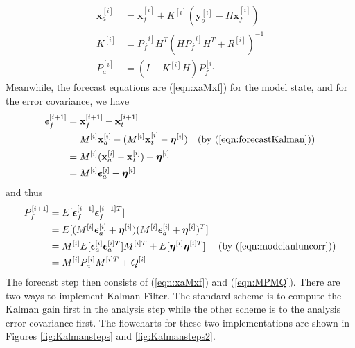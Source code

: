 \begin{subequations}
\begin{align}
\textbf{x}_a^{[i]} &= \textbf{x}_f^{[i]} + K^{[i]}(\textbf{y}_o^{[i]} - H\textbf{x}_f^{[i]}) \\
K^{[i]} &= P_f^{[i]}H^T(HP_f^{[i]}H^T + R^{[i]})^{-1} \\
P_a^{[i]} &= (I - K^{[i]}H)P_f^{[i]} 
\end{align}
\end{subequations}
Meanwhile, the forecast equations are (\ref{eqn:xaMxf}) for the model state, and for the error covariance, we have
\begin{align}
\bm{\epsilon}_f^{[i+1]} &= \textbf{x}_f^{[i+1]} - \textbf{x}_t^{[i+1]} \nonumber \\
&= M^{[i]}\textbf{x}_a^{[i]} - (M^{[i]}\textbf{x}_t^{[i]} - \bm{\eta}^{[i]}) &\text{(by (\ref{eqn:forecastKalman}))} \nonumber \\
&= M^{[i]}(\textbf{x}_a^{[i]} - \textbf{x}_t^{[i]}) + \bm{\eta}^{[i]} \nonumber \\
&= M^{[i]}\bm{\epsilon}_a^{[i]} + \bm{\eta}^{[i]}  
\end{align}
and thus
\begin{align}
P_f^{[i+1]} &= E[\bm{\epsilon}_f^{[i+1]}\bm{\epsilon}_f^{[i+1]T}] \nonumber \\
&= E[(M^{[i]}\bm{\epsilon}_a^{[i]} + \bm{\eta}^{[i]})(M^{[i]}\bm{\epsilon}_a^{[i]} + \bm{\eta}^{[i]})^T] \nonumber \\
&= M^{[i]}E[\bm{\epsilon}_a^{[i]}\bm{\epsilon}_a^{[i]T}]M^{[i]T} + E[\bm{\eta}^{[i]}\bm{\eta}^{[i]T}] &\text{(by (\ref{eqn:modelanluncorr}))} \nonumber \\
&= M^{[i]}P_a^{[i]}M^{[i]T} + Q^{[i]} \label{eqn:MPMQ}
\end{align}
The forecast step then consists of (\ref{eqn:xaMxf}) and (\ref{eqn:MPMQ}). There are two ways to implement Kalman Filter. The standard scheme is to compute the Kalman gain first in the analysis step while the other scheme is to the analysis error covariance first. The flowcharts for these two implementations are shown in Figures \ref{fig:Kalmansteps} and \ref{fig:Kalmansteps2}.

